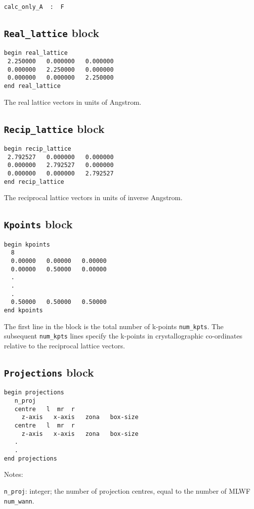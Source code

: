 \verb#calc_only_A  :  F#

\subsection{{\tt Real\_lattice} block}
\begin{verbatim}
begin real_lattice
 2.250000   0.000000   0.000000
 0.000000   2.250000   0.000000
 0.000000   0.000000   2.250000
end real_lattice
\end{verbatim}

The real lattice vectors in units of Angstrom.


\subsection{{\tt Recip\_lattice} block}
\begin{verbatim}
begin recip_lattice
 2.792527   0.000000   0.000000
 0.000000   2.792527   0.000000
 0.000000   0.000000   2.792527
end recip_lattice
\end{verbatim}

The reciprocal lattice vectors in units of inverse Angstrom.


\subsection{{\tt Kpoints} block}
\begin{verbatim}
begin kpoints
  8
  0.00000   0.00000   0.00000
  0.00000   0.50000   0.00000
  .
  .
  .
  0.50000   0.50000   0.50000
end kpoints
\end{verbatim}

The first line in the block is the total number of k-points
\verb#num_kpts#. The subsequent \verb#num_kpts# lines specify the
k-points in crystallographic co-ordinates relative to the reciprocal
lattice vectors.


\subsection{{\tt Projections} block}
\begin{verbatim}
begin projections
   n_proj
   centre   l  mr  r   
     z-axis   x-axis   zona   box-size   
   centre   l  mr  r   
     z-axis   x-axis   zona   box-size   
   .
   .
end projections
\end{verbatim}

\noindent
Notes:

\verb#n_proj#: integer; the number of projection centres, equal to the
number of MLWF \verb#num_wann#.

